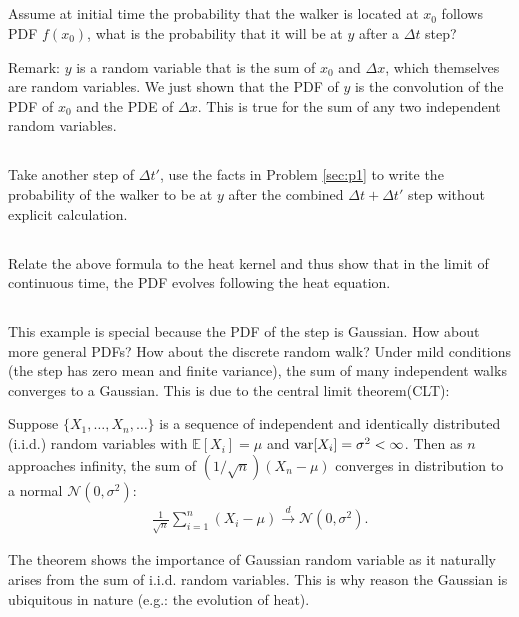\documentclass[11pt,letterpaper]{article}
\begin{document}
\subsection{}
Assume at initial time the probability that the walker is located at $x_0$ follows PDF $f(x_0)$, what is the probability that it will be at $y$ after a $\Delta t$ step?

Remark: $y$ is a random variable that is the sum of $x_0$ and $\Delta x$, which themselves are random variables. We just shown that the PDF of $y$ is the convolution of the PDF of $x_0$ and the PDE of $\Delta x$. This is true for the sum of any two independent random variables.

\subsection{}
Take another step of $\Delta t'$, use the facts in Problem \ref{sec:p1} to write the probability of the walker to be at $y$ after the combined $\Delta t+\Delta t'$ step without explicit calculation.

\subsection{}
Relate the above formula to the heat kernel and thus show that in the limit of continuous time, the PDF evolves following the heat equation.

\subsection{}
This example is special because the PDF of the step is Gaussian. How about more general PDFs? How about the discrete random walk? Under mild conditions (the step has zero mean and finite variance), the sum of many independent walks converges to a Gaussian. This is due to the central limit theorem(CLT):
\begin{displayquote}
    Suppose $\{X_{1},\ldots ,X_{n},\ldots \}$ is a sequence of independent and identically distributed (i.i.d.) random variables with $\mathbb {E} [X_{i}]=\mu$ and $\text{var}[X_{i}]=\sigma ^{2}<\infty$. Then as $n$ approaches infinity, the sum of $(1/\sqrt {n}) (X_n-\mu)$ converges in distribution to a normal $\mathcal {N}(0,\sigma ^{2})$:
    \begin{align}
        \frac{1}{\sqrt{n}}\sum_{i=1}^n (X_i-\mu) \xrightarrow{d} \mathcal {N}(0,\sigma ^{2}).
    \end{align}
\end{displayquote}
The theorem shows the importance of Gaussian random variable as it naturally arises from the sum of i.i.d. random variables. This is why reason the Gaussian is ubiquitous in nature (e.g.: the evolution of heat). 
\end{document}
